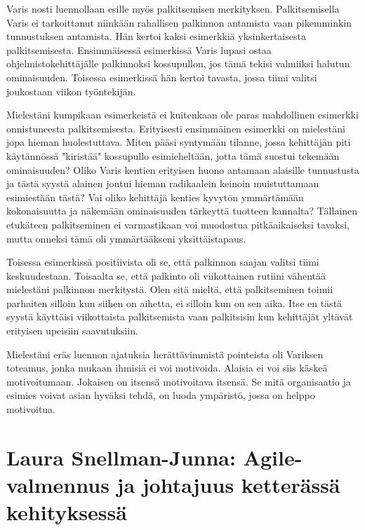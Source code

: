 \documentclass[a4paper]{article}
\begin{document}
Varis nosti luennollaan esille myös palkitsemisen merkityksen. Palkitsemisella Varis ei tarkoittanut niinkään rahallisen palkinnon antamista vaan pikemminkin tunnustuksen antamista. Hän kertoi kaksi esimerkkiä yksinkertaisesta palkitsemisesta. Ensimmäisessä esimerkissä Varis lupasi ostaa ohjelmistokehittäjälle palkinnoksi kossupullon, jos tämä tekisi valmiiksi halutun ominaisuuden. Toisessa esimerkissä hän kertoi tavasta, jossa tiimi valitsi joukostaan viikon työntekijän.

Mielestäni kumpikaan esimerkeistä ei kuitenkaan ole paras mahdollinen esimerkki onnistuneesta palkitsemisesta. Erityisesti ensimmäinen esimerkki on mielestäni jopa hieman huolestuttava. Miten pääsi syntymään tilanne, jossa kehittäjän piti käytännössä "kiristää" kossupullo esimieheltään, jotta tämä suostui tekemään ominaisuuden? Oliko Varis kentien erityisen huono antamaan alaisille tunnustusta ja tästä syystä alainen joutui hieman radikaalein keinoin muistuttamaan esimiestään tästä? Vai oliko kehittäjä kenties kyvytön ymmärtämään kokonaisuutta ja näkemään ominaisuuden tärkeyttä tuotteen kannalta? Tällainen etukäteen palkitseminen ei varmastikaan voi muodostua pitkäaikaiseksi tavaksi, mutta onneksi tämä oli ymmärtääkseni yksittäistapaus.

Toisessa esimerkissä positiivista oli se, että palkinnon saajan valitsi tiimi keskuudestaan. Toisaalta se, että palkinto oli viikottainen rutiini vähentää mielestäni palkinnon merkitystä. Olen sitä mieltä, että palkitseminen toimii parhaiten silloin kun siihen on aihetta, ei silloin kun on sen aika. Itse en tästä syystä käyttäisi viikottaista palkitsemista vaan palkitsisin kun kehittäjät yltävät erityisen upeisiin saavutuksiin.

Mielestäni eräs luennon ajatuksia herättävimmistä pointeista oli Variksen toteamus, jonka mukaan ihmisiä ei voi motivoida. Alaisia ei voi siis käskeä motivoitumaan. Jokaisen on itsensä motivoitava itsensä. Se mitä organisaatio ja esimies voivat asian hyväksi tehdä, on luoda ympäristö, jossa on helppo motivoitua.







\section{Laura Snellman-Junna: Agile-valmennus ja johtajuus ketterässä kehityksessä}





\end{document}
